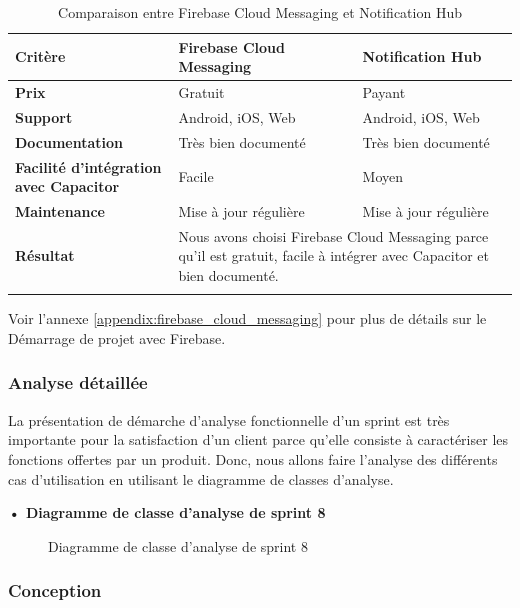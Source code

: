 \begin{longtable}{|p{5cm}|p{5cm}|p{5cm}|}
\hline
\textbf{Critère}&\textbf{Firebase Cloud Messaging}&\textbf{Notification Hub}\\
\hline
\textbf{Prix}&Gratuit&Payant\\
\hline
\textbf{Support}&Android, iOS, Web&Android, iOS, Web\\
\hline
\textbf{Documentation}&Très bien documenté&Très bien documenté\\
\hline
\textbf{Facilité d'intégration avec Capacitor}&Facile&Moyen\\
\hline
\textbf{Maintenance}&Mise à jour régulière&Mise à jour régulière\\
\hline
\textbf{Résultat}&\multicolumn{2}{p{10cm}|}{Nous avons choisi Firebase Cloud Messaging parce qu'il est gratuit, facile à intégrer avec Capacitor et bien documenté.}\\
\hline
\caption{Comparaison entre Firebase Cloud Messaging et Notification Hub}
\label{tab:comparaison_fcm_notification_hub}
\end{longtable}

Voir l'annexe \ref{appendix:firebase_cloud_messaging} pour plus de détails sur le Démarrage de projet avec Firebase.



\subsubsection{Analyse détaillée}
La présentation de démarche d'analyse fonctionnelle d'un sprint est très importante pour la satisfaction d'un client parce qu'elle consiste à caractériser les fonctions offertes par un produit.
Donc, nous allons faire l'analyse des différents cas d'utilisation en utilisant le diagramme de classes d'analyse.


\setlength{\parskip}{1em}
\setlength{\parindent}{0em}

\textbf{•	Diagramme de classe d'analyse de sprint 8 }


\begin{figure}[H]
  \centering
  \caption{Diagramme de classe d'analyse de sprint 8}
  \label{fig:class_analyse_sprint8}
\end{figure}


\subsubsection{Conception}

